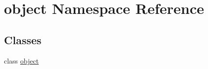 \hypertarget{namespaceobject}{}\section{object Namespace Reference}
\label{namespaceobject}
\subsection*{Classes}
\begin{DoxyCompactItemize}
\item 
class \hyperlink{classobject_1_1object}{object}
\end{DoxyCompactItemize}
